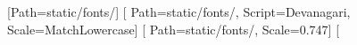 %
%
%
\usepackage{fontspec}
\newfontfamily{}[Path=static/fonts/]
\newfontfamily{}[%
  Path=static/fonts/, Script=Devanagari, Scale=MatchLowercase]
\newfontfamily{}[%
  Path=static/fonts/, Scale=0.747]%
\newfontfamily{}[%
